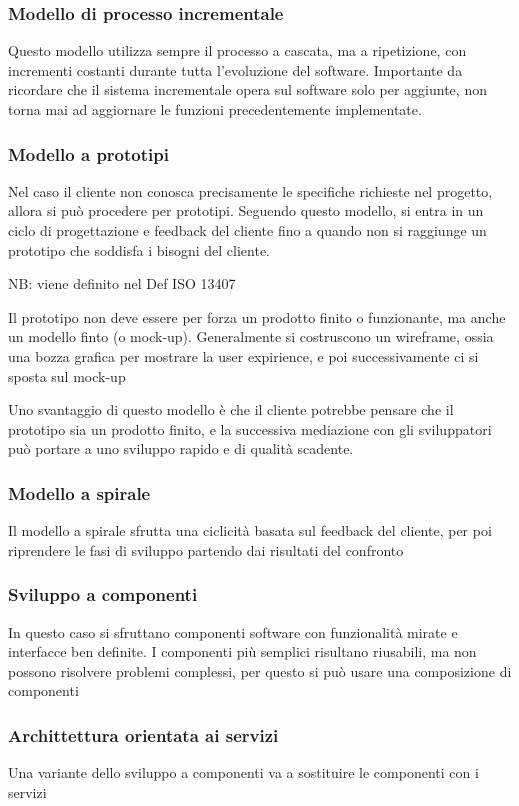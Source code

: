 \documentclass[12pt, a4paper]{article}
\begin{document}
\subsubsection{Modello di processo incrementale}
Questo modello utilizza sempre il processo a cascata, ma a ripetizione, con incrementi costanti durante tutta
l'evoluzione del software. Importante da ricordare che il sistema incrementale opera sul software solo per aggiunte,
non torna mai ad aggiornare le funzioni precedentemente implementate.

\subsubsection{Modello a prototipi}
Nel caso il cliente non conosca precisamente le specifiche richieste nel progetto, allora si può procedere per 
prototipi. Seguendo questo modello, si entra in un ciclo di progettazione e feedback del cliente fino a quando non 
si raggiunge un prototipo che soddisfa i bisogni del cliente.

NB: viene definito nel Def ISO 13407

Il prototipo non deve essere per forza un prodotto finito o funzionante, ma anche un modello finto (o mock-up).
Generalmente si costruscono un wireframe, ossia una bozza grafica per mostrare la user expirience, e poi 
successivamente ci si sposta sul mock-up

Uno svantaggio di questo modello è che il cliente potrebbe pensare che il prototipo sia un prodotto finito, 
e la successiva mediazione con gli sviluppatori può portare a uno sviluppo rapido e di qualità scadente.

\subsubsection{Modello a spirale}
Il modello a spirale sfrutta una ciclicità basata sul feedback del cliente, per poi riprendere le fasi di
sviluppo partendo dai risultati del confronto

\subsubsection{Sviluppo a componenti}
In questo caso si sfruttano componenti software con funzionalità mirate e interfacce ben definite.
I componenti più semplici risultano riusabili, ma non possono risolvere problemi complessi, per questo si può usare
una composizione di componenti

\subsubsection{Archittettura orientata ai servizi}
Una variante dello sviluppo a componenti va a sostituire le componenti con i servizi
\end{document}
